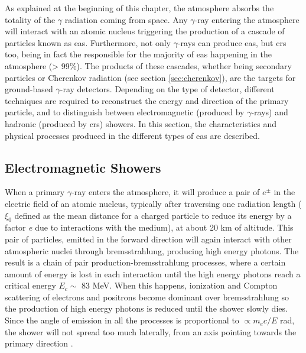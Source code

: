 \documentclass[main.tex]{subfiles}
\begin{document}
As explained at the beginning of this chapter, the atmosphere absorbs the totality of the $\gamma$ radiation coming from space. Any $\gamma$-ray entering the atmosphere will interact with an atomic nucleus triggering the production of a cascade of particles known as \gls{eas}. Furthermore, not only $\gamma$-rays can produce \gls{eas}, but \glspl{cr} too,  being in fact the responsible for the majority of \gls{eas} happening in the atmosphere (> 99\%). The products of these cascades, whether being secondary particles or Cherenkov radiation (see section \ref{sec:cherenkov}), are the targets for ground-based $\gamma$-ray detectors. Depending on the type of detector, different techniques are required to reconstruct the energy and direction of the primary particle, and to distinguish between electromagnetic (produced by $\gamma$-rays) and hadronic (produced by \glspl{cr}) showers. In this section, the characteristics and physical processes produced in the different types of \gls{eas} are described.

\subsection{Electromagnetic Showers}

When a primary $\gamma$-ray enters the atmosphere, it will produce a pair of $e^{\pm}$ in the electric field of an atomic nucleus, typically after traversing one radiation length ($\xi_{0}$ defined as the mean distance for a charged particle to reduce its energy by a factor \textit{e} due to interactions with the medium), at about 20 km of altitude. This pair of particles, emitted in the forward direction will again interact with other atmospheric nuclei through bremsstrahlung, producing high energy photons. The result is a chain of pair production-bremsstrahlung processes, where a certain amount of energy is lost in each interaction until the high energy photons reach a critical energy $E_{c} \sim$ 83 MeV. When this happens, ionization and Compton scattering of electrons and positrons become dominant over bremsstrahlung so the production of high energy photons is reduced until the shower slowly dies. Since the angle of emission in all the processes is proportional to $\propto m_e c / E$ rad, the shower will not spread too much laterally, from an axis pointing towards the primary direction \cite{weekes2003HEAstrophy}.
\end{document}
